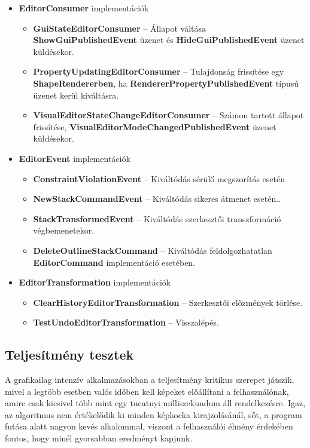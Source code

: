 \begin{itemize}
\begin{itemize}
	\end{itemize}
	\item \textbf{EditorConsumer} implementációk
	\begin{itemize}
		\item \textbf{GuiStateEditorConsumer} -- Állapot váltása \textbf{ShowGuiPublishedEvent} üzenet és \textbf{HideGuiPublishedEvent} üzenet küldésekor.
		\item \textbf{PropertyUpdatingEditorConsumer} -- Tulajdonság frissítése egy \textbf{ShapeRendererben}, ha \textbf{RendererPropertyPublishedEvent} típusú üzenet kerül kiváltásra.
		\item \textbf{VisualEditorStateChangeEditorConsumer} -- Számon tartott állapot frissítése, \textbf{VisualEditorModeChangedPublishedEvent} üzenet küldésekor.
	\end{itemize}
	\item \textbf{EditorEvent} implementációk
	\begin{itemize}
		\item \textbf{ConstraintViolationEvent} -- Kiváltódás sérülő megszorítás esetén
		\item \textbf{NewStackCommandEvent} -- Kiváltódás sikeres átmenet esetén..
		\item \textbf{StackTransformedEvent} -- Kiváltódás szerkesztői transzformáció végbemenetekor.
		\item \textbf{DeleteOutlineStackCommand} -- Kiváltódás feldolgozhatatlan \textbf{EditorCommand} implementáció esetében.
	\end{itemize}
	\item \textbf{EditorTransformation} implementációk
	\begin{itemize}
		\item \textbf{ClearHistoryEditorTransformation} -- Szerkesztői előzmények törlése.
		\item \textbf{TestUndoEditorTransformation} -- Visszalépés.
	\end{itemize}
\end{itemize}

\subsection{Teljesítmény tesztek}

A grafikailag intenzív alkalmazásokban a teljesítmény kritikus szerepet játszik, mivel a legtöbb esetben valós időben kell képeket előállítani a felhasználónak, amire csak kicsivel több mint egy tucatnyi milliszekundum áll rendelkezésre. Igaz, az algoritmus nem értékelődik ki minden képkocka kirajzolásánál, sőt, a program futása alatt nagyon kevés alkalommal, viszont a felhasználói élmény érdekében fontos, hogy minél gyorsabban eredményt kapjunk.

